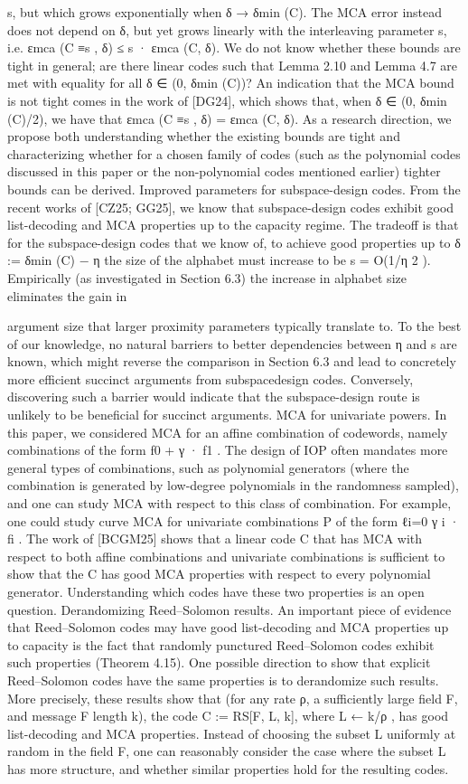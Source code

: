 \documentclass[11pt]{article}
\begin{document}
s, but which grows exponentially when δ → δmin (C). The MCA error instead does not depend on
δ, but yet grows linearly with the interleaving parameter s, i.e. εmca (C ≡s , δ) ≤ s · εmca (C, δ). We do
not know whether these bounds are tight in general; are there linear codes such that Lemma 2.10
and Lemma 4.7 are met with equality for all δ ∈ (0, δmin (C))? An indication that the MCA bound
is not tight comes in the work of [DG24], which shows that, when δ ∈ (0, δmin (C)/2), we have
that εmca (C ≡s , δ) = εmca (C, δ). As a research direction, we propose both understanding whether the
existing bounds are tight and characterizing whether for a chosen family of codes (such as the
polynomial codes discussed in this paper or the non-polynomial codes mentioned earlier) tighter
bounds can be derived.
Improved parameters for subspace-design codes. From the recent works of [CZ25; GG25],
we know that subspace-design codes exhibit good list-decoding and MCA properties up to the
capacity regime. The tradeoff is that for the subspace-design codes that we know of, to achieve
good properties up to δ := δmin (C) − η the size of the alphabet must increase to be s = O(1/η 2 ).
Empirically (as investigated in Section 6.3) the increase in alphabet size eliminates the gain in

argument size that larger proximity parameters typically translate to. To the best of our knowledge,
no natural barriers to better dependencies between η and s are known, which might reverse the
comparison in Section 6.3 and lead to concretely more efficient succinct arguments from subspacedesign codes. Conversely, discovering such a barrier would indicate that the subspace-design route
is unlikely to be beneficial for succinct arguments.
MCA for univariate powers. In this paper, we considered MCA for an affine combination of
codewords, namely combinations of the form f0 + γ · f1 . The design of IOP often mandates more
general types of combinations, such as polynomial generators (where the combination is generated
by low-degree polynomials in the randomness sampled), and one can study MCA with respect to
this class of combination. For example, one could study curve MCA for univariate combinations
P
of the form ℓi=0 γ i · fi . The work of [BCGM25] shows that a linear code C that has MCA with
respect to both affine combinations and univariate combinations is sufficient to show that the C
has good MCA properties with respect to every polynomial generator. Understanding which codes
have these two properties is an open question.
Derandomizing Reed–Solomon results. An important piece of evidence that Reed–Solomon
codes may have good list-decoding and MCA properties up to capacity is the fact that randomly
punctured Reed–Solomon codes exhibit such properties (Theorem 4.15). One possible direction to
show that explicit Reed–Solomon codes have the same properties is to derandomize such results.
More precisely, these results show that (for any rate
ρ, a sufficiently large field F, and message
F 
length k), the code C := RS[F, L, k], where L ← k/ρ
, has good list-decoding and MCA properties.
Instead of choosing the subset L uniformly at random in the field F, one can reasonably consider the
case where the subset L has more structure, and whether similar properties hold for the resulting
codes.
\end{document}

